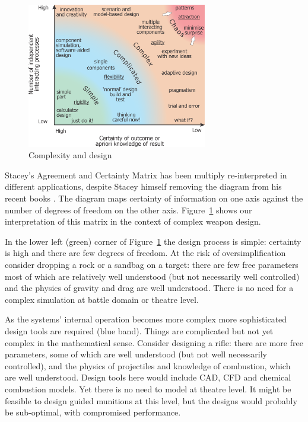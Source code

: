 \begin{figure}[tp]
\includegraphics[width=0.7\textwidth]{pic/scesysinvest04}
\caption{Complexity and design \label{fig:scesysinvest04}}
\end{figure}

Stacey's Agreement and Certainty Matrix 
\cite{Stacey1996}
has been multiply re-interpreted in different applications, despite Stacey himself removing the diagram from his recent books \cite{Stacey2016}.  The diagram maps certainty of information on one axis against the number of degrees of freedom on the other axis. 
Figure~\ref{fig:scesysinvest04} shows our interpretation of this matrix in the context of complex weapon design.  

In the lower left (green) corner of Figure~\ref{fig:scesysinvest04} the design process is simple: certainty is high and there are few degrees of freedom. At the risk of oversimplification consider dropping a rock or a sandbag on a target: there are few free parameters most of which are relatively well understood (but not necessarily well controlled) and the physics of gravity and drag are well understood.  There is no need for a complex simulation at battle domain or theatre level.

As the systems' internal operation becomes more complex more sophisticated design tools are required (blue band). Things are complicated but not yet complex in the mathematical sense.
Consider designing a rifle: there are more free parameters, some of which are well understood (but not well necessarily controlled), and the physics of projectiles and knowledge of combustion, which are well understood. Design tools here would include \ac{CAD}, \ac{CFD} and chemical combustion models. Yet there is no need to model at theatre level.
It might be feasible to design guided munitions at this level, but the designs would probably be sub-optimal, with compromised performance.

